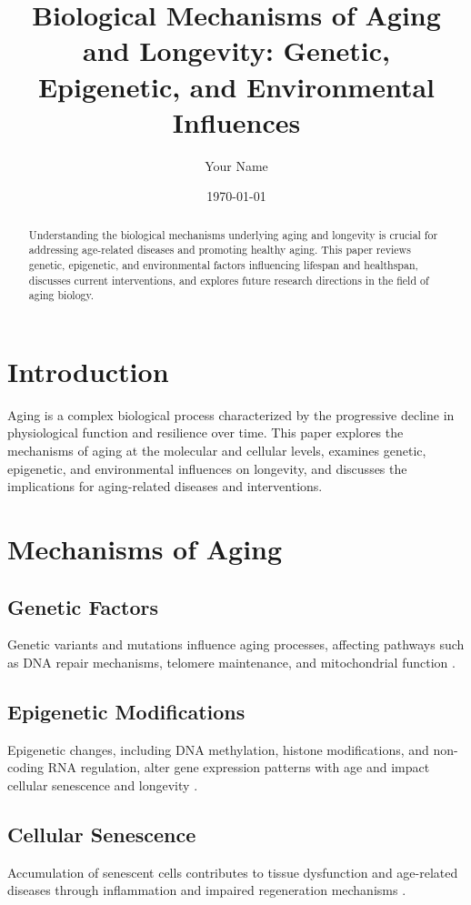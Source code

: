 \documentclass[12pt]{article}
\title{Biological Mechanisms of Aging and Longevity: Genetic, Epigenetic, and Environmental Influences}
\author{Your Name}
\date{\today}
\begin{document}
\maketitle

\begin{abstract}
Understanding the biological mechanisms underlying aging and longevity is crucial for addressing age-related diseases and promoting healthy aging. This paper reviews genetic, epigenetic, and environmental factors influencing lifespan and healthspan, discusses current interventions, and explores future research directions in the field of aging biology.
\end{abstract}

\section{Introduction}
Aging is a complex biological process characterized by the progressive decline in physiological function and resilience over time. This paper explores the mechanisms of aging at the molecular and cellular levels, examines genetic, epigenetic, and environmental influences on longevity, and discusses the implications for aging-related diseases and interventions.

\section{Mechanisms of Aging}
\subsection{Genetic Factors}
Genetic variants and mutations influence aging processes, affecting pathways such as DNA repair mechanisms, telomere maintenance, and mitochondrial function \citep{kenyon2010mechanisms, lopez-otin2013hallmarks}.

\subsection{Epigenetic Modifications}
Epigenetic changes, including DNA methylation, histone modifications, and non-coding RNA regulation, alter gene expression patterns with age and impact cellular senescence and longevity \citep{booth2016epigenetic, maegawa2017epigenetic}.

\subsection{Cellular Senescence}
Accumulation of senescent cells contributes to tissue dysfunction and age-related diseases through inflammation and impaired regeneration mechanisms \citep{he2019cellular, demaria2014cellular}.
\end{document}

